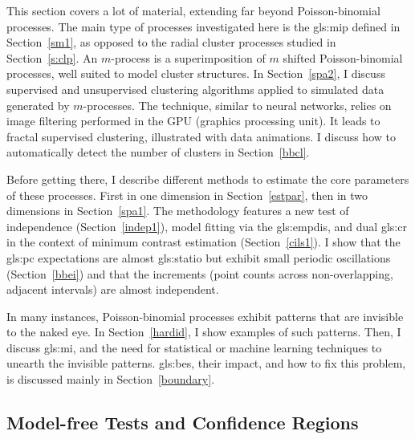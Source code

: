 \documentclass[10pt]{article}
\begin{document}
This section covers a lot of material, extending far beyond Poisson-binomial processes. The main type of processes investigated here is the
\gls{gls:mip} defined in Section~\ref{sm1},
 as opposed to the radial cluster processes studied in Section~\ref{s:clp}. An $m$-process is a superimposition of $m$ shifted Poisson-binomial processes, well suited to model cluster structures. In Section~\ref{spa2}, I discuss supervised and unsupervised clustering algorithms applied to
simulated data generated by $m$-processes. The technique, similar to \textcolor{index}{neural networks}, relies on
\textcolor{index}{image filtering} performed in the
\textcolor{index}{GPU} (graphics processing unit). It leads to
\textcolor{index}{fractal supervised clustering}, illustrated with
data animations. I discuss how to automatically detect the number of clusters in Section~\ref{bbcl}.

Before getting there, I describe different methods to estimate the core parameters of these processes. First in one dimension in Section~\ref{estpar}, then in two dimensions in Section~\ref{spa1}.
The methodology features a new test of independence (Section~\ref{indep1}), model fitting via the
 \gls{gls:empdis}, and
\textcolor{index}{dual} \gls{gls:cr} in the context of
\textcolor{index}{minimum contrast estimation}
 (Section~\ref{cils1}). I show that the \gls{gls:pc} expectations are almost
\gls{gls:statio} but exhibit small periodic oscillations (Section~\ref{bbei}) and that
the increments (point counts across non-overlapping, adjacent intervals) are almost independent.

In many instances, Poisson-binomial processes exhibit patterns that are invisible to the naked eye. In Section~\ref{hardid}, I show examples of such patterns. Then, I discuss \gls{gls:mi}, and the need for statistical or machine learning techniques to unearth the invisible patterns.
\Glspl{gls:be}, their impact, and how to fix this problem, is discussed mainly in Section~\ref{boundary}.

\subsection{Model-free Tests and Confidence Regions}\label{ci0}
\end{document}
